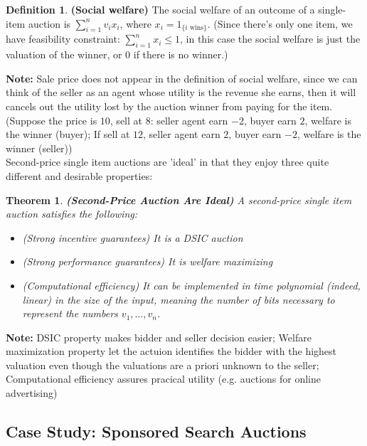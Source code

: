 \documentclass[10pt]{article}
\newtheorem{thm}{Theorem}[section]
\theoremstyle{definition}
\newtheorem{defn}{Definition}[section]
\newcommand{\Note}[0]{\noindent\textbf{Note: }}
\begin{document}
\begin{defn} \textbf{(Social welfare)}
	The social welfare of an outcome of a single-item auction is $\sum_{i=1}^{n}v_{i}x_{i}$, where $x_{i} = 1_{\{i \text{ wins}\}}$.
	(Since there's only one item, we have feasibility constraint: $\sum_{i=1}^{n}x_{i} \le 1$, in this case the social welfare is just
	the valuation of the winner, or $0$ if there is no winner.)
\end{defn}

\Note Sale price does not appear in the definition of social welfare, since we can think of the seller as an agent whose utility is the revenue she earns,
then it will cancels out the utility lost by the auction winner from paying for the item.
(Suppose the price is $10$, sell at $8$: seller agent earn $-2$, buyer earn $2$, welfare is the winner (buyer);
If sell at $12$, seller agent earn $2$, buyer earn $-2$, welfare is the winner (seller)) \\

Second-price single item auctions are 'ideal' in that they enjoy three quite different and desirable properties:
\begin{thm} \textbf{(Second-Price Auction Are Ideal)}
	A second-price single item auction satisfies the following:
	\begin{itemize}
		\item (Strong incentive guarantees) It is a DSIC auction
		\item (Strong performance guarantees) It is welfare maximizing
		\item (Computational efficiency) It can be implemented in time polynomial (indeed, linear) in the size of the input,
		      meaning the number of bits necessary to represent the numbers $v_{1}, \dots, v_{n}$.
	\end{itemize}
\end{thm}

\Note DSIC property makes bidder and seller decision easier; Welfare maximization property let the actuion identifies the bidder with the highest valuation
even though the valuations are a priori unknown to the seller; Computational efficiency assures pracical utility (e.g. auctions for online advertising)


\subsection{Case Study: Sponsored Search Auctions}
\end{document}
